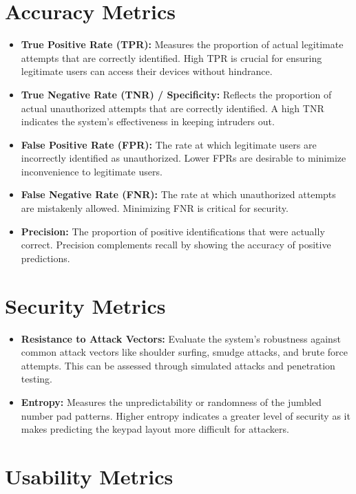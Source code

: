 \documentclass{article}
\begin{document}
\section*{Accuracy Metrics}

\begin{itemize}[label=--,leftmargin=*]
    \item \textbf{True Positive Rate (TPR):} Measures the proportion of actual legitimate attempts that are correctly identified. High TPR is crucial for ensuring legitimate users can access their devices without hindrance.
    \item \textbf{True Negative Rate (TNR) / Specificity:} Reflects the proportion of actual unauthorized attempts that are correctly identified. A high TNR indicates the system's effectiveness in keeping intruders out.
    \item \textbf{False Positive Rate (FPR):} The rate at which legitimate users are incorrectly identified as unauthorized. Lower FPRs are desirable to minimize inconvenience to legitimate users.
    \item \textbf{False Negative Rate (FNR):} The rate at which unauthorized attempts are mistakenly allowed. Minimizing FNR is critical for security.
    \item \textbf{Precision:} The proportion of positive identifications that were actually correct. Precision complements recall by showing the accuracy of positive predictions.
\end{itemize}

\section*{Security Metrics}

\begin{itemize}[label=--,leftmargin=*]
    \item \textbf{Resistance to Attack Vectors:} Evaluate the system's robustness against common attack vectors like shoulder surfing, smudge attacks, and brute force attempts. This can be assessed through simulated attacks and penetration testing.
    \item \textbf{Entropy:} Measures the unpredictability or randomness of the jumbled number pad patterns. Higher entropy indicates a greater level of security as it makes predicting the keypad layout more difficult for attackers.
\end{itemize}

\section*{Usability Metrics}
\end{document}
